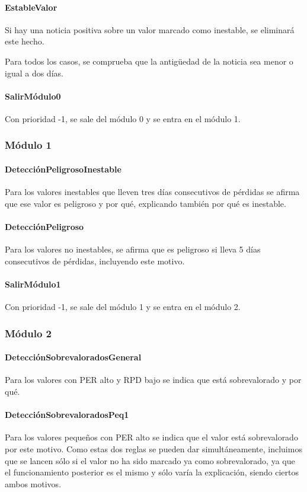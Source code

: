 \documentclass[11pt,leqno]{article}
\theoremstyle{definition_wo_parentheses}
\theoremstyle{plain}
\theoremstyle{remark}
\begin{document}
\paragraph{EstableValor} Si hay una noticia positiva sobre un valor marcado como inestable, se eliminará este hecho.

Para todos los casos, se comprueba que la antigüedad de la noticia sea menor o igual a dos días. 

\paragraph{SalirMódulo0} Con prioridad -1, se sale del módulo 0 y se entra en el módulo 1.

\subsubsection{Módulo 1} 

\paragraph{DetecciónPeligrosoInestable} Para los valores inestables que lleven tres días consecutivos de pérdidas se afirma que ese valor es peligroso y por qué, explicando también por qué es inestable.

\paragraph{DetecciónPeligroso} Para los valores no inestables, se afirma que es peligroso si lleva 5 días consecutivos de pérdidas, incluyendo este motivo.

\paragraph{SalirMódulo1} Con prioridad -1, se sale del módulo 1 y se entra en el módulo 2.


\subsubsection{Módulo 2}

\paragraph{DetecciónSobrevaloradosGeneral} Para los valores con PER alto y RPD bajo se indica que está sobrevalorado y por qué. 

\paragraph{DetecciónSobrevaloradosPeq1} Para los valores pequeños con PER alto se indica que el valor está sobrevalorado por este motivo. Como estas dos reglas se pueden dar simultáneamente, incluimos que se lancen sólo si el valor no ha sido marcado ya como sobrevalorado, ya que el funcionamiento posterior es el mismo y sólo varía la explicación, siendo ciertos ambos motivos. 
\end{document}
